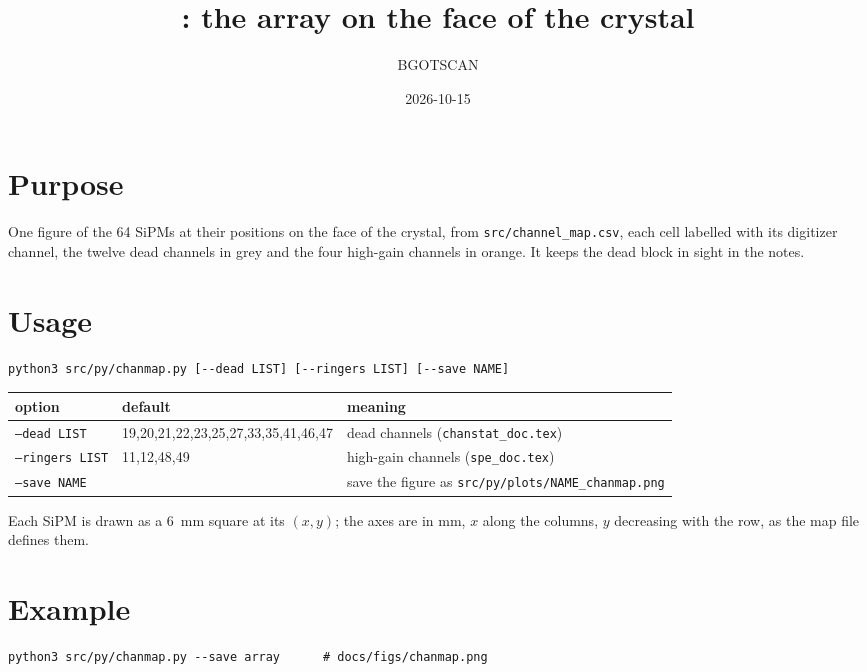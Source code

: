 \documentclass[11pt]{article}
\title{\code{chanmap.py}: the array on the face of the crystal}
\author{BGOTSCAN}
\date{2026-10-15}
\newcommand{\code}[1]{\texttt{#1}}
\begin{document}
\maketitle

\section{Purpose}

One figure of the 64 SiPMs at their positions on the face of the crystal,
from \code{src/channel\_map.csv}, each cell labelled with its digitizer
channel, the twelve dead channels in grey and the four high-gain channels
in orange. It keeps the dead block in sight in the notes.

\section{Usage}

\begin{lstlisting}
python3 src/py/chanmap.py [--dead LIST] [--ringers LIST] [--save NAME]
\end{lstlisting}

\begin{center}
\begin{tabular}{l l p{80mm}}
\toprule
option & default & meaning \\
\midrule
\code{--dead LIST} & 19,20,21,22,23,25,27,33,35,41,46,47 & dead channels (\code{chanstat\_doc.tex}) \\
\code{--ringers LIST} & 11,12,48,49 & high-gain channels (\code{spe\_doc.tex}) \\
\code{--save NAME} & & save the figure as \code{src/py/plots/NAME\_chanmap.png} \\
\bottomrule
\end{tabular}
\end{center}

Each SiPM is drawn as a 6~mm square at its $(x, y)$; the axes are in mm,
$x$ along the columns, $y$ decreasing with the row, as the map file
defines them.

\section{Example}

\begin{lstlisting}
python3 src/py/chanmap.py --save array      # docs/figs/chanmap.png
\end{lstlisting}
\end{document}
